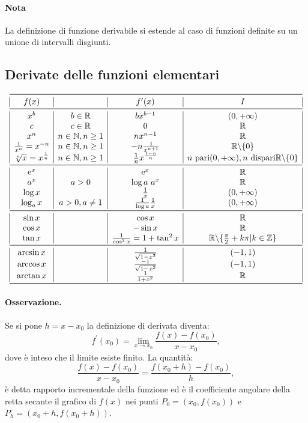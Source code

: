 \paragraph*{Nota} La definizione di funzione derivabile si estende al caso di funzioni definite su un unione di intervalli disgiunti.

\subsection{Derivate delle funzioni elementari}
\begin{equation*}
\begin{array}{ |*{4}{c|} }
\toprule
f(x) & & f^\prime(x) & I \\
\midrule
x^b & b\in\R        & bx^{b-1} & (0,+\infty) \\
c   & c\in\R        & 0        & \R          \\
x^n & n\in\N,n\geq1 & nx^{n-1} & \R          \\
\frac{1}{x^n}=x^{-n} & n\in\N,n\geq1 & -n\frac{1}{x^{n+1}} & \R \backslash\{0\} \\
\sqrt[n]{x} = x^{\frac{1}{n}} & n\in\N,n\geq1 & \frac{1}{n} x^{\frac{1-n}{n}} & n\text{ pari}(0,+\infty),n \text{ dispari} \R\backslash\{0\} \\
\midrule
\e^x & & \e^x & \R \\
a^x & a>0 & \log a \text{ } a^x & \R \\
\log x & & \frac{1}{x} & (0,+\infty) \\
\log_a x & a>0,a\neq 1 & \frac{1}{\log a}\frac{1}{x} & (0,+\infty) \\
\midrule
\sin x & & \cos x & \R \\
\cos x & & -\sin x & \R \\
\tan x & & \frac{1}{\cos^2 x}=1+\tan^2 x & \R\backslash\{\frac{\pi}{2}+k\pi | k\in \Z\} \\
\midrule
\arcsin x & & \frac{1}{\sqrt{1-x^2}} & (-1,1) \\
\arccos x & & \frac{-1}{\sqrt{1-x^2}} & (-1,1) \\
\arctan x & & \frac{1}{1+x^2} & \R \\
\bottomrule
\end{array}
\end{equation*}

\paragraph{Osservazione.}
Se si pone $h=x-x_0$ la definizione di derivata diventa:
\[f^\prime(x_0)=\lim_{x\to x_0} \frac{f(x)-f(x_0)}{x-x_0},\]
dove è inteso che il limite esiste finito. La quantità:
\[\frac{f(x)-f(x_0)}{x-x_0}=\frac{f(x_0+h)-f(x_0)}{h},\]
è detta rapporto incrementale della funzione ed è il coefficiente angolare della retta secante il grafico di $f(x)$ nei punti $P_0=(x_0,f(x_0))$ e $P_h=(x_0+h,f(x_0+h))$.

